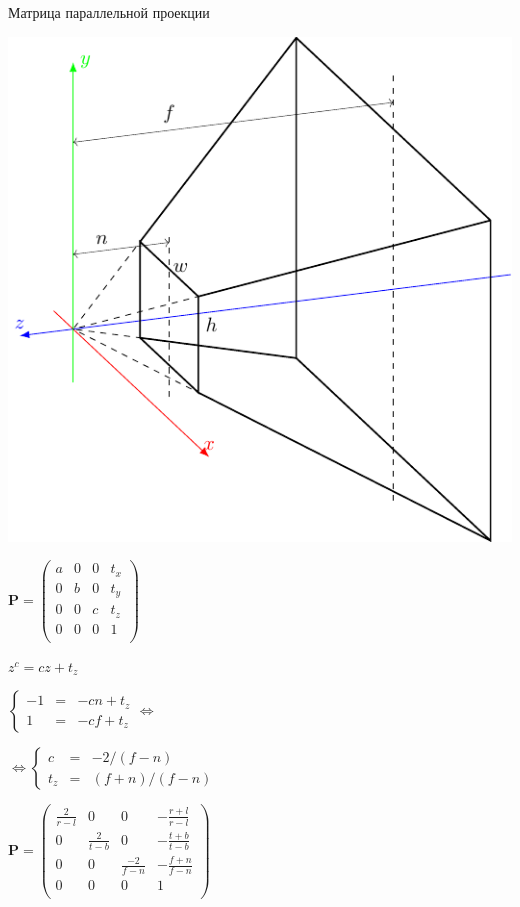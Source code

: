 \documentclass[10pt]{beamer}
\begin{document}
	\begin{frame}{Матрица параллельной проекции}
		
		\centering
		\includegraphics[page=4]{cvv.pdf}
		
		{
			$\mathbf P =
			\begin{pmatrix}
				a& 0& 0& t_x \\
				0& b& 0& t_y \\
				0& 0& c& t_z \\
				0& 0& 0& 1 \\
			\end{pmatrix}
			$
			
			$z^c = cz+t_z $
			
			$ \left\lbrace
			\begin{array}{rcl}
				-1 &= & -cn + t_z \\
				1& = & -cf + t_z
			\end{array}
			 \right. \Leftrightarrow $
			 
			 $ \Leftrightarrow \left\lbrace
			 \begin{array}{rcl}
			 	c &  = & -2/(f-n) \\
			 	t_z& = & (f+n)/(f-n)
			 \end{array}
			 \right. $
		}
		{
			$\mathbf P =
			\begin{pmatrix}
				\frac{2}{r-l}& 0& 0& -\frac{r+l}{r-l} \\
				0& \frac{2}{t-b}& 0& -\frac{t+b}{t-b} \\
				0& 0& \frac{-2}{f-n}& -\frac{f+n}{f-n} \\
				0& 0& 0& 1 \\
			\end{pmatrix}
			$
		}
		

		
		
		
		
	\end{frame}
	
\end{document}
